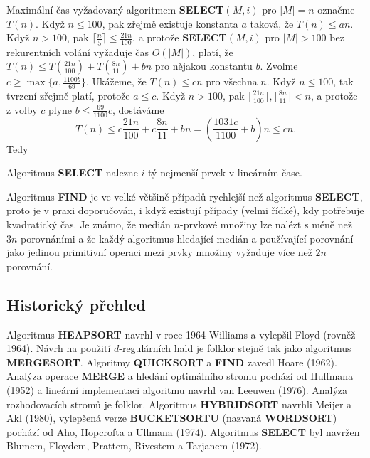 \documentclass[a4paper,12pt]{article}
\begin{document}
Maximální čas vyžadovaný algoritmem  
{\bf SELECT$(M,i)$} pro $|M|=n$ označme $T(n)$.  Když $n\le 
100$, pak zřejmě 
exis\-tuje konstanta $a$ taková, že $T(n)\le an$.  Když $
n>100$, 
pak $\lceil\frac n5\rceil\le\frac {21n}{100}$, a protože {\bf SELECT$
(M,i)$} pro $|M|>100$ bez 
rekurentních volání vyžaduje čas $O(|M|)$, platí, že $
T(n)\le T(\frac {21n}{100})+T(\frac {8n}{11})+bn$ pro nějakou konstantu 
$b$.  Zvolme $c\ge\max\{a,\frac {1100b}{69}\}$. Ukážeme, že $
T(n)\le cn$ pro 
všechna $n$.  
Když $n\le 100$, tak tvrzení zřejmě platí, protože $
a\le c$.  Když 
$n>100$, pak $\lceil\frac {21n}{100}\rceil ,\lceil\frac {8n}{11}\rceil 
<n$, a protože z volby $c$ plyne 
$b\le\frac {69}{1100}c$, 
dostáváme 
$$T(n)\le c\frac {21n}{100}+c\frac {8n}{11}+bn=(\frac {1031c}{110
0}+b)n\le cn.$$
Tedy

\begin{veta}Algoritmus {\bf SELECT} nalezne $i$-tý nejmenší 
prvek v lineárním čase.
\end{veta}

Algoritmus {\bf FIND} je ve velké většině 
případů 
rychlejší než algoritmus {\bf SELECT}, proto je v praxi 
doporučován, i když existují 
případy (velmi řídké), kdy potřebuje kvadratický čas.
Je známo, že medián $n$-prvkové množiny lze nalézt s 
méně než $3n$ porovnáními a že každý algoritmus hledající 
medián a používající porovnání jako jedinou primitivní 
operaci mezi prvky množiny vyžaduje více než $2n$ 
porovnání.

\subsection{
Historický přehled
}

Algoritmus {\bf HEAPSORT }
navrhl v roce 1964 Williams a vylepšil Floyd (rovněž 1964).  Návrh 
na použití $d$-regulár\-ních hald je folklor stejně tak jako  
algoritmus {\bf MER\-GESORT}.  Algoritmy {\bf QUICKSORT} a {\bf FIND }
zavedl Hoare (1962).  Analýza ope\-race {\bf MERGE} a 
hledání optimálního stro\-mu pochází od Huffmana 
(1952) a lineární implementaci algoritmu navrhl van 
Leeuwen (1976).  Analýza rozhodovacích stromů je 
folklor. Algoritmus {\bf HYBRIDSORT} navrhli Meijer a Akl (1980), 
vylepše\-ná verze {\bf BUCKETSORTU} (nazvaná {\bf WORDSORT}) 
pochází od Aho, Hopcrofta a Ullmana (1974). Algoritmus {\bf SELECT} byl 
navržen Blumem, Floydem, Prattem, Rivestem a 
Tarjanem (1972).  
\end{document}
